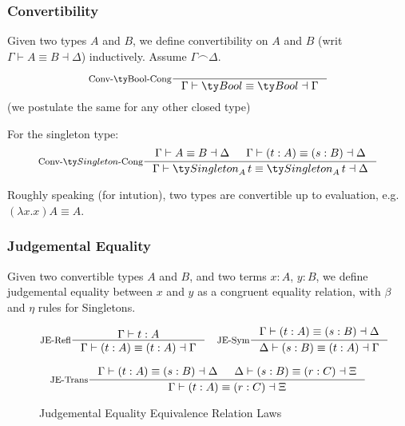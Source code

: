 \subsubsection{Convertibility}
Given two types $A$ and $B$, we define convertibility on $A$ and $B$ (writ $\Gamma \vdash A \equiv B \dashv \Delta$) inductively. Assume $\Gamma \frown \Delta$.

\[
\inference[Conv-\Bool-Cong]{}{\Gamma \vdash \Bool \equiv \Bool \dashv \Gamma}
\]
(we postulate the same for any other closed type)

For the singleton type:
\[
\inference[Conv-$\Singleton$-Cong]
    { \Gamma \vdash A \equiv B \dashv \Delta
    & \Gamma \vdash (t : A) \equiv (s : B) \dashv \Delta
    }
    { \Gamma \vdash \Singleton[A][t] \equiv \Singleton[A][t] \dashv \Delta }
\]

Roughly speaking (for intution), two types are convertible up to evaluation, e.g. $(\lambda x. x) A \equiv A$.

\subsubsection{Judgemental Equality}
Given two convertible types $A$ and $B$, and two terms $x : A$, $y : B$, we define judgemental equality between $x$ and $y$ as a congruent equality relation, with $\beta$ and $\eta$ rules for Singletons.

\begin{figure*}[h]
  \[
    \inference[JE-Refl]{\Gamma \vdash t : A}
                    {\Gamma \vdash (t : A) \equiv (t : A) \dashv \Gamma}
    \quad
    \inference[JE-Sym]{\Gamma \vdash (t : A) \equiv (s : B) \dashv \Delta}
                     {\Delta \vdash (s : B) \equiv (t : A) \dashv \Gamma}
  \]

  \[
    \inference[JE-Trans]{\Gamma \vdash (t : A) \equiv (s : B) \dashv \Delta & \Delta \vdash (s : B) \equiv (r : C) \dashv \Xi}
                     {\Gamma \vdash (t : A) \equiv (r : C) \dashv \Xi}
  \]

  \caption*{Judgemental Equality Equivalence Relation Laws}
  \label{fig:dt-singletons-je-er}
\end{figure*}

